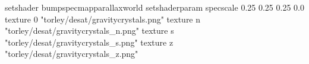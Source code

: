 setshader bumpspecmapparallaxworld
setshaderparam specscale 0.25 0.25 0.25 0.0
texture 0 "torley/desat/gravitycrystals.png"
texture n "torley/desat/gravitycrystals_n.png"
texture s "torley/desat/gravitycrystals_s.png"
texture z "torley/desat/gravitycrystals_z.png"

